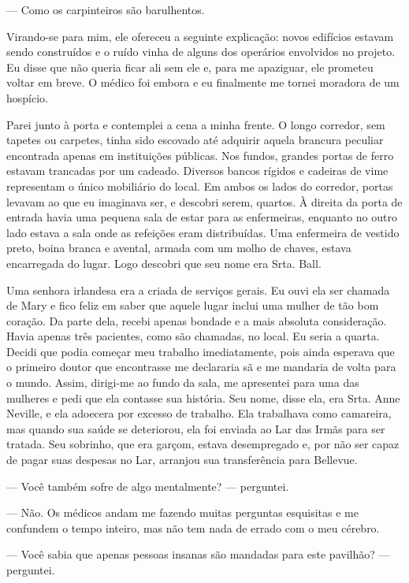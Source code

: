 --- Como os carpinteiros são barulhentos.

Virando-se para mim, ele ofereceu a seguinte explicação: novos edifícios
estavam sendo construídos e o ruído vinha de alguns dos operários
envolvidos no projeto. Eu disse que não queria ficar ali sem ele e, para
me apaziguar, ele prometeu voltar em breve. O médico foi embora e eu
finalmente me tornei moradora de um hospício.

Parei junto à porta e contemplei a cena a minha frente. O longo
corredor, sem tapetes ou carpetes, tinha sido escovado até adquirir
aquela brancura peculiar encontrada apenas em instituições públicas. Nos
fundos, grandes portas de ferro estavam trancadas por um cadeado.
Diversos bancos rígidos e cadeiras de vime representam o único
mobiliário do local. Em ambos os lados do corredor, portas levavam ao
que eu imaginava ser, e descobri serem, quartos. À direita da porta de
entrada havia uma pequena sala de estar para as enfermeiras, enquanto no
outro lado estava a sala onde as refeições eram distribuídas. Uma
enfermeira de vestido preto, boina branca e avental, armada com um molho
de chaves, estava encarregada do lugar. Logo descobri que seu nome era
Srta. Ball.

Uma senhora irlandesa era a criada de serviços gerais. Eu ouvi ela ser
chamada de Mary e fico feliz em saber que aquele lugar inclui uma mulher
de tão bom coração. Da parte dela, recebi apenas bondade e a mais
absoluta consideração. Havia apenas três pacientes, como são chamadas,
no local. Eu seria a quarta. Decidi que podia começar meu trabalho
imediatamente, pois ainda esperava que o primeiro doutor que encontrasse
me declararia sã e me mandaria de volta para o mundo. Assim, dirigi-me
ao fundo da sala, me apresentei para uma das mulheres e pedi que ela
contasse sua história. Seu nome, disse ela, era Srta. Anne Neville, e
ela adoecera por excesso de trabalho. Ela trabalhava como camareira, mas
quando sua saúde se deteriorou, ela foi enviada ao Lar das Irmãs para
ser tratada. Seu sobrinho, que era garçom, estava desempregado e, por
não ser capaz de pagar suas despesas no Lar, arranjou sua transferência
para Bellevue.

--- Você também sofre de algo mentalmente? --- perguntei.

--- Não. Os médicos andam me fazendo muitas perguntas esquisitas e me
confundem o tempo inteiro, mas não tem nada de errado com o meu cérebro.

--- Você sabia que apenas pessoas insanas são mandadas para este
pavilhão? --- perguntei.

